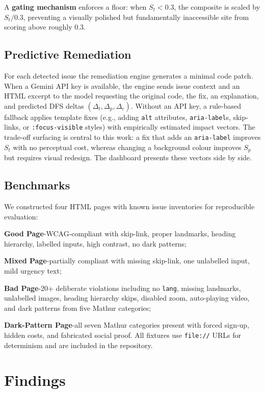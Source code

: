 \documentclass[runningheads]{llncs}
\begin{document}
A \textbf{gating mechanism} enforces a floor: when $S_t < 0.3$, the composite is scaled by $S_t / 0.3$, preventing a visually polished but fundamentally inaccessible site from scoring above roughly 0.3.


\subsection{Predictive Remediation}

For each detected issue the remediation engine generates a minimal code patch. When a Gemini API key is available, the engine sends issue context and an HTML excerpt to the model requesting the original code, the fix, an explanation, and predicted DFS deltas $(\Delta_t, \Delta_p, \Delta_e)$. Without an API key, a rule-based fallback applies template fixes (e.g., adding \texttt{alt} attributes, \texttt{aria-label}s, skip-links, or \texttt{:focus-visible} styles) with empirically estimated impact vectors. The trade-off surfacing is central to this work: a fix that adds an \texttt{aria-label} improves $S_t$ with no perceptual cost, whereas changing a background colour improves $S_p$ but requires visual redesign. The dashboard presents these vectors side by side.


\subsection{Benchmarks}

We constructed four HTML pages with known issue inventories for reproducible evaluation:

\textbf{Good Page}-WCAG-compliant with skip-link, proper landmarks, heading hierarchy, labelled inputs, high contrast, no dark patterns;

\textbf{Mixed Page}-partially compliant with missing skip-link, one unlabelled input, mild urgency text;

\textbf{Bad Page}-20+ deliberate violations including no \texttt{lang}, missing landmarks, unlabelled images, heading hierarchy skips, disabled zoom, auto-playing video, and dark patterns from five Mathur categories;

\textbf{Dark-Pattern Page}-all seven Mathur categories present with forced sign-up, hidden costs, and fabricated social proof.
All fixtures use \texttt{file://} URLs for determinism and are included in the repository.



\section{Findings}
\end{document}
